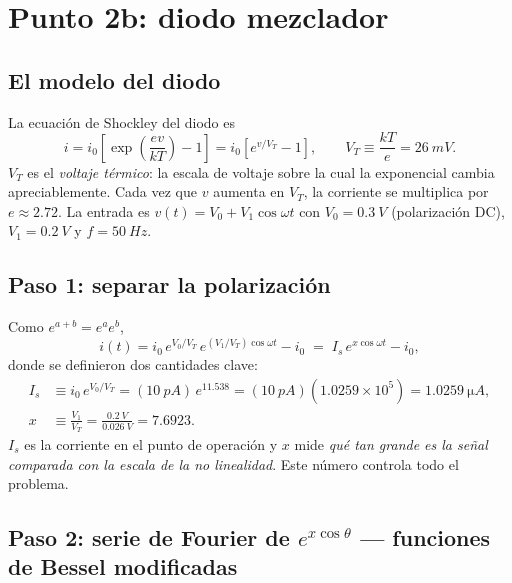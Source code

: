 \documentclass[11pt,letterpaper]{article}
\newcommand{\VT}{V_T}
\begin{document}
\section{Punto 2b: diodo mezclador}

\subsection{El modelo del diodo}

La ecuación de Shockley del diodo es
\begin{equation}
  i=i_0\left[\exp\!\left(\frac{ev}{kT}\right)-1\right]=i_0\left[e^{v/\VT}-1\right],\qquad \VT\equiv\frac{kT}{e}=\SI{26}{mV}.
\end{equation}
$\VT$ es el \emph{voltaje térmico}: la escala de voltaje sobre la cual la exponencial cambia apreciablemente.
Cada vez que $v$ aumenta en $\VT$, la corriente se multiplica por $e\approx2.72$. La entrada es
$v(t)=V_0+V_1\cos\omega t$ con $V_0=\SI{0.3}{V}$ (polarización DC), $V_1=\SI{0.2}{V}$ y $f=\SI{50}{Hz}$.

\subsection{Paso 1: separar la polarización}

Como $e^{a+b}=e^ae^b$,
\begin{equation}
  i(t)=i_0\,e^{V_0/\VT}\,e^{(V_1/\VT)\cos\omega t}-i_0
      \;=\;I_s\,e^{x\cos\omega t}-i_0,
\end{equation}
donde se definieron dos cantidades clave:
\begin{align}
  I_s &\equiv i_0\,e^{V_0/\VT}=(\SI{10}{pA})\,e^{11.538}=(\SI{10}{pA})(1.0259\times10^5)=\SI{1.0259}{\micro A},\\
  x &\equiv \frac{V_1}{\VT}=\frac{\SI{0.2}{V}}{\SI{0.026}{V}}=7.6923 .
\end{align}
$I_s$ es la corriente en el punto de operación y $x$ mide \emph{qué tan grande es la señal comparada con la
escala de la no linealidad}. Este número controla todo el problema.

\subsection{Paso 2: serie de Fourier de $e^{x\cos\theta}$ — funciones de Bessel modificadas}
\end{document}
